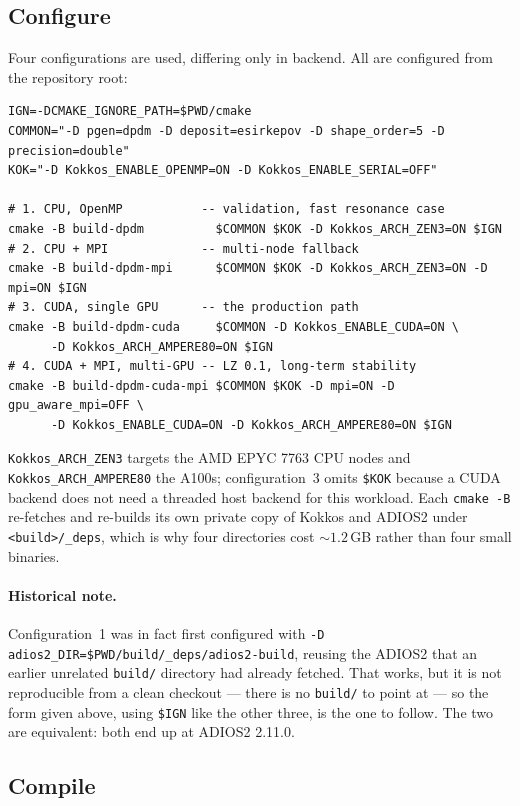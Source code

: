 \documentclass[11pt,a4paper]{article}
\newcommand{\code}[1]{\texttt{\small #1}}
\begin{document}
\subsection{Configure}

Four configurations are used, differing only in backend. All are configured from the
repository root:

\begin{lstlisting}
IGN=-DCMAKE_IGNORE_PATH=$PWD/cmake
COMMON="-D pgen=dpdm -D deposit=esirkepov -D shape_order=5 -D precision=double"
KOK="-D Kokkos_ENABLE_OPENMP=ON -D Kokkos_ENABLE_SERIAL=OFF"

# 1. CPU, OpenMP           -- validation, fast resonance case
cmake -B build-dpdm          $COMMON $KOK -D Kokkos_ARCH_ZEN3=ON $IGN
# 2. CPU + MPI             -- multi-node fallback
cmake -B build-dpdm-mpi      $COMMON $KOK -D Kokkos_ARCH_ZEN3=ON -D mpi=ON $IGN
# 3. CUDA, single GPU      -- the production path
cmake -B build-dpdm-cuda     $COMMON -D Kokkos_ENABLE_CUDA=ON \
      -D Kokkos_ARCH_AMPERE80=ON $IGN
# 4. CUDA + MPI, multi-GPU -- LZ 0.1, long-term stability
cmake -B build-dpdm-cuda-mpi $COMMON $KOK -D mpi=ON -D gpu_aware_mpi=OFF \
      -D Kokkos_ENABLE_CUDA=ON -D Kokkos_ARCH_AMPERE80=ON $IGN
\end{lstlisting}

\code{Kokkos\_ARCH\_ZEN3} targets the AMD EPYC 7763 CPU nodes and
\code{Kokkos\_ARCH\_AMPERE80} the A100s; configuration~3 omits \code{\$KOK} because a
CUDA backend does not need a threaded host backend for this workload. Each \code{cmake
-B} re-fetches and re-builds its own private copy of Kokkos and ADIOS2 under
\code{<build>/\_deps}, which is why four directories cost ${\sim}1.2$\,GB rather than
four small binaries.

\paragraph{Historical note.} Configuration~1 was in fact first configured with
\code{-D adios2\_DIR=\$PWD/build/\_deps/adios2-build}, reusing the ADIOS2 that an
earlier unrelated \code{build/} directory had already fetched. That works, but it is
not reproducible from a clean checkout --- there is no \code{build/} to point at --- so
the form given above, using \code{\$IGN} like the other three, is the one to follow.
The two are equivalent: both end up at ADIOS2 2.11.0.

\subsection{Compile}
\end{document}
